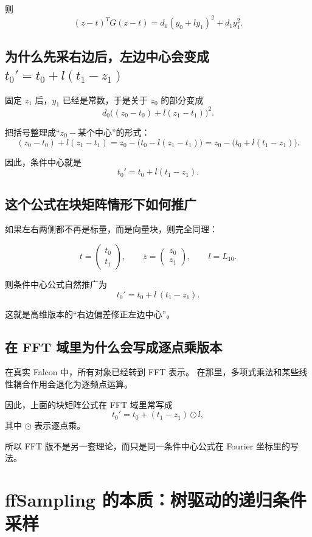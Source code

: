 \documentclass[11pt,a4paper]{ctexart}
\begin{document}
则
\[
(z-t)^T G (z-t)
=
d_0(y_0+l y_1)^2+d_1 y_1^2.
\]

\subsection{为什么先采右边后，左边中心会变成 \(t_0'=t_0+l(t_1-z_1)\)}

固定 \(z_1\) 后，\(y_1\) 已经是常数，于是关于 \(z_0\) 的部分变成
\[
d_0\big((z_0-t_0)+l(z_1-t_1)\big)^2.
\]

把括号整理成“\(z_0-\text{某个中心}\)”的形式：
\[
(z_0-t_0)+l(z_1-t_1)
=
z_0-\bigl(t_0-l(z_1-t_1)\bigr)
=
z_0-\bigl(t_0+l(t_1-z_1)\bigr).
\]

因此，条件中心就是
\[
\boxed{
t_0' = t_0 + l(t_1-z_1).
}
\]

\subsection{这个公式在块矩阵情形下如何推广}

如果左右两侧都不再是标量，而是向量块，则完全同理：

\[
t=
\begin{pmatrix}
t_0\\
t_1
\end{pmatrix},
\qquad
z=
\begin{pmatrix}
z_0\\
z_1
\end{pmatrix},
\qquad
l=L_{10}.
\]

则条件中心公式自然推广为
\[
\boxed{
t_0' = t_0 + l\,(t_1-z_1).
}
\]

这就是高维版本的“右边偏差修正左边中心”。

\subsection{在 FFT 域里为什么会写成逐点乘版本}

在真实 Falcon 中，所有对象已经转到 FFT 表示。  
在那里，多项式乘法和某些线性耦合作用会退化为逐频点运算。

因此，上面的块矩阵公式在 FFT 域里常写成
\[
\boxed{
t_0' = t_0 + (t_1-z_1)\odot l,
}
\]
其中 \(\odot\) 表示逐点乘。

所以 FFT 版不是另一套理论，而只是同一条件中心公式在 Fourier 坐标里的写法。

\section{ffSampling 的本质：树驱动的递归条件采样}
\end{document}
